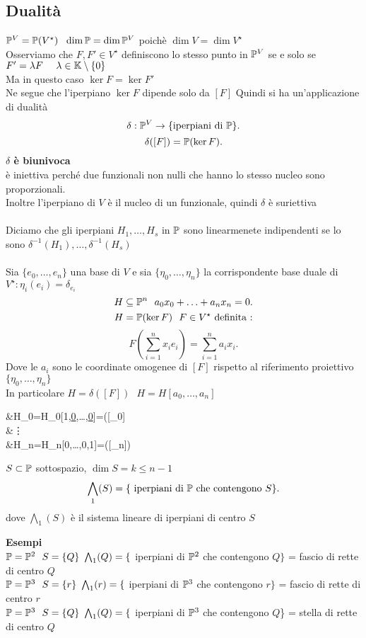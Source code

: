 \documentclass[12px]{article}
\begin{document}
	 \subsection{Dualità}
	 $\pro^V=\pro(V^\star)\ \ \dim\pro=\dim\pro^V$ poichè  $\dim V=\dim V^\star$\\
	 Osserviamo che  $F,F'\in V^\star$ definiscono lo stesso punto in  $\mathbb{P}^V$ se e solo se  \\$F'= \lambda F\ \ \ \ \lambda\in\K\setminus\{0\}$\\
	 Ma in questo caso $\ker F = \ker F'$\\
	 Ne segue che l'iperpiano  $\ker F$ dipende solo da  $[F]$ Quindi si ha un'applicazione di dualità 
	  \[
		  \delta :\mathbb{P}^V \rightarrow \{\text{iperpiani di }\mathbb{P}\}
	 .\] 
	 \[
		 \delta([F]) = \mathbb{P}(\ker F)
	 .\] 
	 \textbf{$\delta$ è biunivoca}\\
	 è iniettiva perché due funzionali non nulli che hanno lo stesso nucleo sono proporzionali.\\
	 Inoltre l'iperpiano di $V$ è il nucleo di un funzionale, quindi  $\delta$ è suriettiva\\
	 \ \hline \ \\
	 Diciamo che gli iperpiani $H_1,\ldots,H_s$ in $\mathbb{P}$ sono linearmenete indipendenti se lo sono $\delta^{-1}(H_1),\ldots,\delta^{-1}(H_s)$ \ \\ \hline \ \\
	 Sia $\{e_0,\ldots,e_n\}$ una base di $V$ e sia $\{\eta_0,\ldots,\eta_n\}$ la corrispondente base duale di $V^\star:\eta_i(e_i)=\delta_{e_i}$ 
	 \[
	 H\subseteq \pro^n \ \ a_0x_0+\ldots+a_nx_n=0
	 .\] 
\[
	H = \mathbb{P}(\ker F) \ \ F\in V^\star \text{ definita :}
\] 
\[
F(\sum^n_{i=1}x_ie_i)=\sum^n_{i=1}a_ix_i
.\] 
Dove le $a_i$ sono le coordinate omogenee di  $[F] $ rispetto al riferimento proiettivo  $\{\eta_0,\ldots,\eta_n\}$\\
In particolare $H=\delta([F]) \ \ \ H=H[a_0,\ldots,a_n]$ \\
\begin{aligend}
	&H_0=H_0[1,\underline{0},\ldots,\underline{0}]=\delta([\eta_0]\\
	&\vdots\\
	&H_n=H_n[0,\ldots,0,1]=\delta([\eta_n])
\end{aligend}
\begin{defi}
	$S\subset \mathbb{P}$ sottospazio,  $\dim S = k \leq n-1$
	\[
		\bigwedge_1(S) = \{\text{ iperpiani di }\mathbb{P} \text{ che contengono } S\}
	.\] 
	dove $\bigwedge_1(S)$ è il sistema lineare di iperpiani di centro $S$
\end{defi}
\textbf{Esempi}\\
$\mathbb{P}=\mathbb{P}^2 \ \ S = \{Q\}\ \ \\
\bigwedge_1(Q) = \{$ iperpiani di $\mathbb{P}^2$  che contengono $Q\}$ = fascio di rette di centro $Q$\\
$\mathbb{P}=\mathbb{P}^3 \ \ S = \{r\}\ \ \\ \bigwedge_1(r) = \{$ iperpiani di $\mathbb{P}^3$ che contengono $r\}$ = fascio di rette di centro $r$\\
$\mathbb{P}=\mathbb{P}^3 \ \ S = \{Q\}\ \ \\ \bigwedge_1(Q) = \{$ iperpiani di $\mathbb{P}^3$ che contengono $Q$\} = stella di rette di centro $Q$\\
\end{document}

